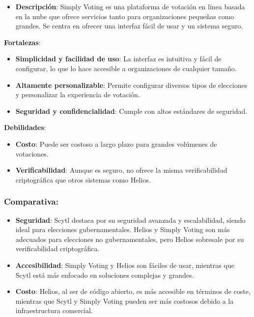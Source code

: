 \documentclass{article}
\begin{document}
\begin{itemize}
    \item \textbf{Descripción}: Simply Voting es una plataforma de votación en línea basada en la nube que ofrece servicios tanto para organizaciones pequeñas como grandes. Se centra en ofrecer una interfaz fácil de usar y un sistema seguro.
\end{itemize}
\textbf{Fortalezas}:
    \begin{itemize}
        \item \textbf{Simplicidad y facilidad de uso}: La interfaz es intuitiva y fácil de configurar, lo que lo hace accesible a organizaciones de cualquier tamaño.
        \item \textbf{Altamente personalizable}: Permite configurar diversos tipos de elecciones y personalizar la experiencia de votación.
        \item \textbf{Seguridad y confidencialidad}: Cumple con altos estándares de seguridad.
    \end{itemize}
\textbf{Debilidades}:
    \begin{itemize}
        \item \textbf{Costo}: Puede ser costoso a largo plazo para grandes volúmenes de votaciones.
        \item \textbf{Verificabilidad}: Aunque es seguro, no ofrece la misma verificabilidad criptográfica que otros sistemas como Helios.
    \end{itemize}

\subsubsection{Comparativa:}

\begin{itemize}
    \item \textbf{Seguridad}: Scytl destaca por su seguridad avanzada y escalabilidad, siendo ideal para elecciones gubernamentales. Helios y Simply Voting son más adecuados para elecciones no gubernamentales, pero Helios sobresale por su verificabilidad criptográfica.
    \item \textbf{Accesibilidad}: Simply Voting y Helios son fáciles de usar, mientras que Scytl está más enfocado en soluciones complejas y grandes.
    \item \textbf{Costo}: Helios, al ser de código abierto, es más accesible en términos de coste, mientras que Scytl y Simply Voting pueden ser más costosos debido a la infraestructura comercial.
\end{itemize}
 
\end{document}
